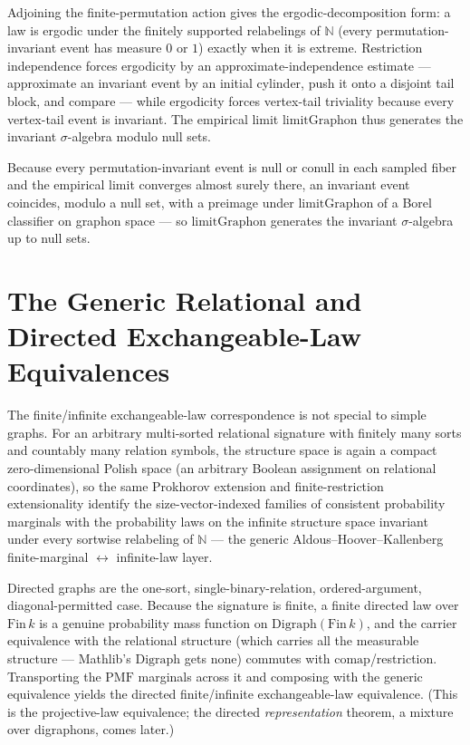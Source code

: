 
Adjoining the finite-permutation action gives the ergodic-decomposition form: a law is
ergodic under the finitely supported relabelings of $\mathbb{N}$ (every permutation-invariant
event has measure $0$ or $1$) exactly when it is extreme. Restriction independence forces
ergodicity by an approximate-independence estimate --- approximate an invariant event by an
initial cylinder, push it onto a disjoint tail block, and compare --- while ergodicity forces
vertex-tail triviality because every vertex-tail event is invariant. The empirical limit
$\mathrm{limitGraphon}$ thus generates the invariant $\sigma$-algebra modulo null sets.


Because every permutation-invariant event is null or conull in each sampled fiber and the
empirical limit converges almost surely there, an invariant event coincides, modulo a null
set, with a preimage under $\mathrm{limitGraphon}$ of a Borel classifier on graphon space ---
so $\mathrm{limitGraphon}$ generates the invariant $\sigma$-algebra up to null sets.


\section{The Generic Relational and Directed Exchangeable-Law Equivalences}

The finite/infinite exchangeable-law correspondence is not special to simple graphs. For an
arbitrary multi-sorted relational signature with finitely many sorts and countably many
relation symbols, the structure space is again a compact zero-dimensional Polish space (an
arbitrary Boolean assignment on relational coordinates), so the same Prokhorov extension and
finite-restriction extensionality identify the size-vector-indexed families of consistent
probability marginals with the probability laws on the infinite structure space invariant under
every sortwise relabeling of $\mathbb{N}$ --- the generic Aldous--Hoover--Kallenberg
finite-marginal $\leftrightarrow$ infinite-law layer.


Directed graphs are the one-sort, single-binary-relation, ordered-argument, diagonal-permitted
case. Because the signature is finite, a finite directed law over $\mathrm{Fin}\,k$ is a genuine
probability mass function on $\mathrm{Digraph}(\mathrm{Fin}\,k)$, and the carrier equivalence
with the relational structure (which carries all the measurable structure --- Mathlib's
$\mathrm{Digraph}$ gets none) commutes with $\mathrm{comap}$/restriction. Transporting the
$\mathrm{PMF}$ marginals across it and composing with the generic equivalence yields the
directed finite/infinite exchangeable-law equivalence. (This is the projective-law equivalence;
the directed \emph{representation} theorem, a mixture over digraphons, comes later.)

